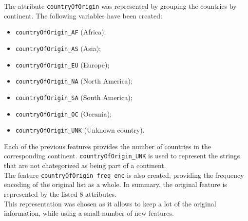 The attribute \texttt{countryOfOrigin} was represented by grouping the countries by continent.
The following variables have been created: 
\begin{multicols}{2}
\begin{itemize}
    \item \texttt{countryOfOrigin\_AF} (Africa);
    \item \texttt{countryOfOrigin\_AS} (Asia);
    \item \texttt{countryOfOrigin\_EU} (Europe);
    \item \texttt{countryOfOrigin\_NA} (North America);
    \item \texttt{countryOfOrigin\_SA} (South America);
    \item \texttt{countryOfOrigin\_OC} (Oceania);
    \item \texttt{countryOfOrigin\_UNK} (Unknown country).
\end{itemize}
\end{multicols}

Each of the previous features provides the number of countries in the corresponding continent.
\texttt{countryOfOrigin\_UNK} is used to represent the strings that are not chategorized as being part of a
continent.\\

The feature \texttt{countryOfOrigin\_freq\_enc} is also created, providing the frequency encoding of the
original list as a whole. In summary, the original feature is represented by the listed 8 attributes.\\

This representation was chosen as it allows to keep a lot of the original information, while using
a small number of new features.\\




